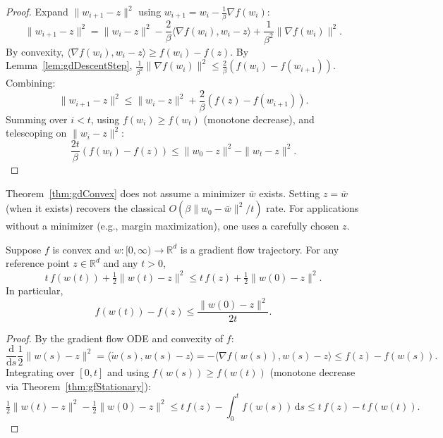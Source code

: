 \begin{proof}
Expand $\|w_{i+1} - z\|^2$ using $w_{i+1} = w_i - \frac{1}{\beta}\nabla f(w_i)$:
\[
  \|w_{i+1} - z\|^2 = \|w_i - z\|^2 - \frac{2}{\beta}\langle \nabla f(w_i), w_i - z\rangle + \frac{1}{\beta^2}\|\nabla f(w_i)\|^2.
\]
By convexity, $\langle \nabla f(w_i), w_i - z\rangle \ge f(w_i) - f(z)$.
By Lemma~\ref{lem:gdDescentStep}, $\frac{1}{\beta^2}\|\nabla f(w_i)\|^2 \le \frac{2}{\beta}(f(w_i) - f(w_{i+1}))$.
Combining:
\[
  \|w_{i+1} - z\|^2 \le \|w_i - z\|^2 + \frac{2}{\beta}(f(z) - f(w_{i+1})).
\]
Summing over $i < t$, using $f(w_i) \ge f(w_t)$ (monotone decrease), and telescoping on $\|w_i - z\|^2$:
\[
  \frac{2t}{\beta}(f(w_t) - f(z)) \le \|w_0 - z\|^2 - \|w_t - z\|^2.
\]
\end{proof}

\begin{remark}
Theorem~\ref{thm:gdConvex} does not assume a minimizer $\bar{w}$ exists.
Setting $z = \bar{w}$ (when it exists) recovers the classical $O(\beta \|w_0 - \bar{w}\|^2 / t)$ rate.
For applications without a minimizer (e.g., margin maximization), one uses a carefully chosen $z$.
\end{remark}

\begin{theorem}\label{thm:gfConvex}
Suppose $f$ is convex and $w : [0, \infty) \to \mathbb{R}^d$ is a gradient flow trajectory.
For any reference point $z \in \mathbb{R}^d$ and any $t > 0$,
\[
  t\, f(w(t)) + \tfrac{1}{2}\|w(t) - z\|^2 \le t\, f(z) + \tfrac{1}{2}\|w(0) - z\|^2.
\]
In particular,
\[
  f(w(t)) - f(z) \le \frac{\|w(0) - z\|^2}{2t}.
\]
\end{theorem}

\begin{proof}
By the gradient flow ODE and convexity of $f$:
\[
  \frac{\mathrm{d}}{\mathrm{d}s}\frac{1}{2}\|w(s) - z\|^2
    = \langle \dot{w}(s), w(s) - z \rangle
    = -\langle \nabla f(w(s)), w(s) - z \rangle
    \le f(z) - f(w(s)).
\]
Integrating over $[0, t]$ and using $f(w(s)) \ge f(w(t))$ (monotone decrease via Theorem~\ref{thm:gfStationary}):
\[
  \tfrac{1}{2}\|w(t) - z\|^2 - \tfrac{1}{2}\|w(0) - z\|^2 \le t\, f(z) - \int_0^t f(w(s))\, \mathrm{d}s
    \le t\, f(z) - t\, f(w(t)).
\]
\end{proof}


